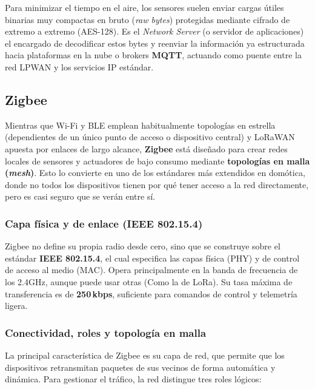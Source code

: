 \documentclass[../main.tex]{subfiles}
\begin{document}
                Para minimizar el tiempo en el aire, los sensores suelen enviar cargas útiles binarias muy compactas en bruto (\emph{raw bytes}) protegidas mediante cifrado de extremo a extremo (AES-128). Es el \emph{Network Server} (o servidor de aplicaciones) el encargado de decodificar estos bytes y reenviar la información ya estructurada hacia plataformas en la nube o brokers \textbf{MQTT}, actuando como puente entre la red LPWAN y los servicios IP estándar.

        \subsection{Zigbee}
            Mientras que Wi-Fi y BLE emplean habitualmente topologías en estrella (dependientes de un único punto de acceso o dispositivo central) y LoRaWAN apuesta por enlaces de largo alcance, \textbf{Zigbee} está diseñado para crear redes locales de sensores y actuadores de bajo consumo mediante \textbf{topologías en malla (\emph{mesh})}. Esto lo convierte en uno de los estándares más extendidos en domótica, donde no todos los dispositivos tienen por qué tener acceso a la red directamente, pero es casi seguro que se verán entre sí.

            \subsubsection{Capa física y de enlace (IEEE 802.15.4)}
                Zigbee no define su propia radio desde cero, sino que se construye sobre el estándar \textbf{IEEE 802.15.4}, el cual especifica las capas física (PHY) y de control de acceso al medio (MAC). Opera principalmente en la banda de frecuencia de los 2.4GHz, aunque puede usar otras (Como la de LoRa). Su tasa máxima de transferencia es de \textbf{250\,kbps}, suficiente para comandos de control y telemetría ligera.

            \subsubsection{Conectividad, roles y topología en malla}
                La principal característica de Zigbee es su capa de red, que permite que los dispositivos retransmitan paquetes de sus vecinos de forma automática y dinámica. Para gestionar el tráfico, la red distingue tres roles lógicos:
\end{document}
